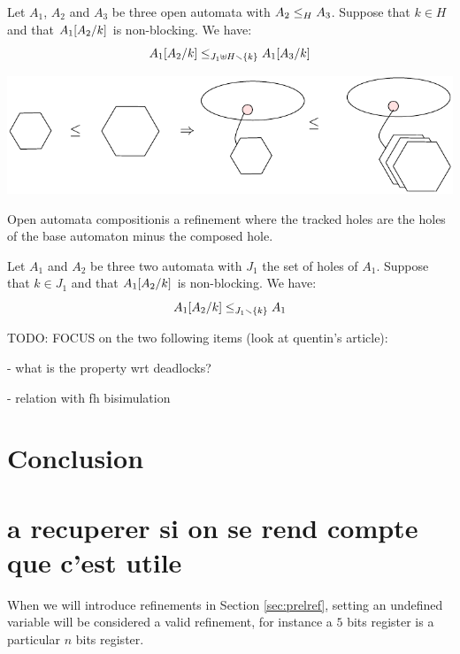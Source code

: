 \documentclass[runningheads]{llncs}
\begin{document}
\begin{theorem}[Congruence]\label{thm:Congruence}
Let $A_1$, $A_2$ and $A_3$ be three open automata with $\wrel{A_2}{A_3}{H}$. 
Suppose that \(k \in H\) and that \(A_1\subst{A_2}{k}\) is non-blocking.
We have: \[\wrel{A_1\subst{A_2}{k}}{A_1\subst{A_3}{k}}{J_1 \uplus H \setminus \mbrc{k}}\]
\end{theorem}



\begin{center}
\includegraphics[scale=0.7]{Figures/Theorem1}
\end{center}

Open automata compositionis a refinement where
the tracked holes are the holes of the base automaton minus the composed hole.
\begin{theorem}\label{thm:Composition}
Let $A_1$ and  $A_2$  be three two automata with $J_1$ the set of holes of $A_1$.
Suppose that \(k \in J_1\) and that \(A_1\subst{A_2}{k}\) is non-blocking. We have:
\[ \wrel{A_1\subst{A_2}{k}}{A_1}{J_1\setminus \{k\}}\]
\end{theorem}


TODO: FOCUS on the two following items (look at quentin's article):


- what is the property wrt deadlocks?


- relation with fh bisimulation



\section{Conclusion}\label{sec:ccl}


 
 

\section{a recuperer si on se rend compte que c'est utile}
When we will introduce refinements in Section \ref{sec:prelref}, setting an undefined variable will be considered a valid refinement, for instance a \(5\) bits register is a particular \(n\) bits register.
\end{document}
